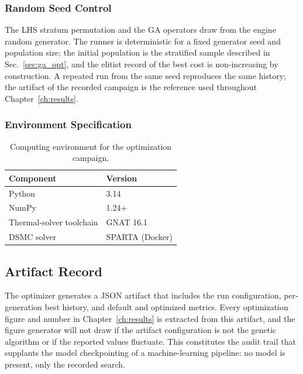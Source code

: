 \subsubsection*{Random Seed Control}
The LHS stratum permutation and the GA operators draw from the engine random generator. The runner is deterministic for a fixed generator seed and population size; the initial population is the stratified sample described in Sec.~\ref{sec:ga_opt}, and the elitist record of the best cost is non-increasing by construction. A repeated run from the same seed reproduces the same history; the artifact of the recorded campaign is the reference used throughout Chapter~\ref{ch:results}.

\subsubsection*{Environment Specification}
\begin{table}[H]
    \centering
    \caption{Computing environment for the optimization campaign.}
    \label{tab:env_spec}
    \begin{tabular}{|l|l|}
        \hline
        \textbf{Component} & \textbf{Version} \\ \hline
        Python & 3.14 \\ \hline
        NumPy & 1.24+ \\ \hline
        Thermal-solver toolchain & GNAT 16.1 \\ \hline
        DSMC solver & SPARTA (Docker) \\ \hline
    \end{tabular}
\end{table}

\subsection{Artifact Record}
The optimizer generates a JSON artifact that includes the run configuration, per-generation best history, and default and optimized metrics. Every optimization figure and number in Chapter~\ref{ch:results} is extracted from this artifact, and the figure generator will not draw if the artifact configuration is not the genetic algorithm or if the reported values fluctuate. This constitutes the audit trail that supplants the model checkpointing of a machine-learning pipeline: no model is present, only the recorded search.

\clearpage
